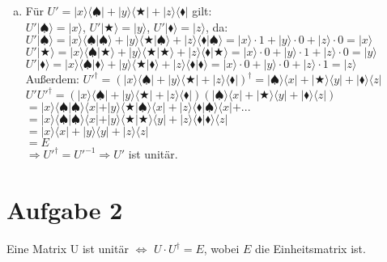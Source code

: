 \documentclass[a4paper]{scrartcl}
\begin{document}
\begin{enumerate}[a)]
\item Für $U'=|x\rangle\langle\spadesuit|+|y\rangle\langle\bigstar|+|z\rangle\langle\blacklozenge|$ gilt:\\
$U'|\spadesuit\rangle=|x\rangle$, $U'|\bigstar\rangle=|y\rangle$, $U'|\blacklozenge\rangle=|z\rangle$, da:\\
$U'|\spadesuit\rangle=|x\rangle\langle\spadesuit|\spadesuit\rangle+|y\rangle\langle\bigstar|\spadesuit\rangle+|z\rangle\langle\blacklozenge|\spadesuit\rangle = |x\rangle\cdot 1+|y\rangle\cdot 0+|z\rangle\cdot 0=|x\rangle$\\
$U'|\bigstar\rangle=|x\rangle\langle\spadesuit|\bigstar\rangle+|y\rangle\langle\bigstar|\bigstar\rangle+|z\rangle\langle\blacklozenge|\bigstar\rangle = |x\rangle\cdot 0+|y\rangle\cdot 1+|z\rangle\cdot 0=|y\rangle$\\
$U'|\blacklozenge\rangle=|x\rangle\langle\spadesuit|\blacklozenge\rangle+|y\rangle\langle\bigstar|\blacklozenge\rangle+|z\rangle\langle\blacklozenge|\blacklozenge\rangle = |x\rangle\cdot 0+|y\rangle\cdot 0+|z\rangle\cdot 1=|z\rangle$\\
Außerdem: $U'^{\dagger}=(|x\rangle\langle\spadesuit|+|y\rangle\langle\bigstar|+|z\rangle\langle\blacklozenge|)^{\dagger}=|\spadesuit\rangle\langle x|+|\bigstar\rangle\langle y|+|\blacklozenge\rangle\langle z|$\\
$U' U'^{\dagger}=(|x\rangle\langle\spadesuit|+|y\rangle\langle\bigstar|+|z\rangle\langle\blacklozenge|)(|\spadesuit\rangle\langle x|+|\bigstar\rangle\langle y|+|\blacklozenge\rangle\langle z|)$\\
$=|x\rangle\langle\spadesuit|\spadesuit\rangle\langle x|+|y\rangle\langle\bigstar|\spadesuit\rangle\langle x|+|z\rangle\langle\blacklozenge|\spadesuit\rangle\langle x|+...$\\
$=|x\rangle\langle\spadesuit|\spadesuit\rangle\langle x|+|y\rangle\langle\bigstar|\bigstar\rangle\langle y|+|z\rangle\langle\blacklozenge|\blacklozenge\rangle\langle z|$\\
$=|x\rangle\langle x|+|y\rangle\langle y|+|z\rangle\langle z|$\\
$=E$\\
$\Rightarrow U'^{\dagger} = U'^{-1} \Rightarrow U'$ ist unitär.

\end{enumerate}
\newpage
\section*{Aufgabe 2}
Eine Matrix U ist unitär $\Leftrightarrow$ $U\cdot U^{\dagger}=E$, wobei $E$ die Einheitsmatrix ist.\\\\
\end{document}
